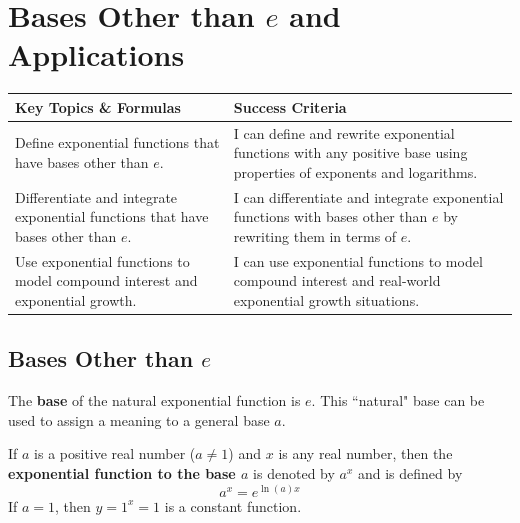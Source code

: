 \documentclass[12pt, letterpaper]{article}
\begin{document}
\section{Bases Other than $e$ and Applications}
\begin{objectives}
    \renewcommand{\arraystretch}{1.5} %
    \begin{tabularx}{\textwidth}{@{} >{\raggedright\arraybackslash}X >{\raggedright\arraybackslash}X @{}}
        
        \textbf{Key Topics \& Formulas} & \textbf{Success Criteria} \\ 
        \midrule[1.5pt] %
        
        Define exponential functions that have bases other than $e$.
        & I can define and rewrite exponential functions with any positive base using properties of exponents and logarithms. \\
        \midrule %
        
        Differentiate and integrate exponential functions that have bases other than $e$.
        & I can differentiate and integrate exponential functions with bases other than $e$ by rewriting them in terms of $e$. \\
        \midrule

        Use exponential functions to model compound interest and exponential growth.
        & I can use exponential functions to model compound interest and real-world exponential growth situations.
    \end{tabularx}
\end{objectives}


\subsection{Bases Other than $e$}

The \textbf{base} of the natural exponential function is $e$. This ``natural" base can be used to assign a meaning to a general base $a$.

\begin{definition}[title=Definition of Exponential Function to Base $a$]
    If $a$ is a positive real number ($a\neq1$) and $x$ is any real number, then the \textbf{exponential function to the base $a$} is denoted by $a^x$ and is defined by 
    $$a^x = e^{\ln(a)x}$$
    If $a=1$, then $y=1^x=1$ is a constant function.
\end{definition}
\end{document}
